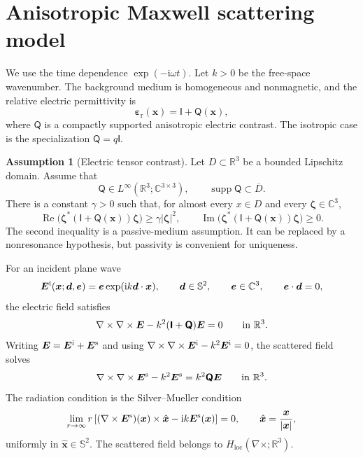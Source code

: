 \documentclass[11pt]{article}
\numberwithin{equation}{section}
\newcommand{\R}{\mathbb{R}}
\newcommand{\C}{\mathbb{C}}
\newcommand{\Sph}{\mathbb{S}}
\newcommand{\ii}{\mathrm{i}}
\newcommand{\supp}{\operatorname{supp}}
\newcommand{\curl}{\nabla\times}
\newcommand{\vect}[1]{\bm{#1}}
\newcommand{\tens}[1]{\bm{\mathsf{#1}}}
\newcommand{\Id}{\ensuremath{\tens{I}}}
\newcommand{\epsr}{\ensuremath{\bm{\varepsilon}_{\mathrm r}}}
\newcommand{\Qt}{\ensuremath{\tens{Q}}}
\newcommand{\abs}[1]{\left\lvert #1\right\rvert}
\theoremstyle{plain}
\theoremstyle{definition}
\newtheorem{assumption}[theorem]{Assumption}
\begin{document}
\section{Anisotropic Maxwell scattering model}\label{sec:forward}

We use the time dependence $\exp(-\ii\omega t)$.  Let $k>0$ be the free-space wavenumber.  The background medium is homogeneous and nonmagnetic, and the relative electric permittivity is
\begin{equation*}
  \epsr(\vect{x})=\Id+\Qt(\vect{x}),
\end{equation*}
where $\Qt$ is a compactly supported anisotropic electric contrast.  The isotropic case is the specialization $\Qt=q\Id$.

\begin{assumption}[Electric tensor contrast]\label{ass:tensor}
Let $D\subset\R^3$ be a bounded Lipschitz domain.  Assume that
\begin{equation*}
  \Qt\in L^\infty(\R^3;\C^{3\times3}),\qquad \supp \Qt\subset \overline D .
\end{equation*}
There is a constant $\gamma>0$ such that, for almost every $x\in D$ and every $\vect{\zeta}\in\C^3$,
\begin{equation*}
  \operatorname{Re}\big(\vect{\zeta}^{*}(\Id+\Qt(\vect{x}))\vect{\zeta}\big)\ge \gamma \abs{\vect{\zeta}}^2,
  \qquad
  \operatorname{Im}\big(\vect{\zeta}^{*}(\Id+\Qt(\vect{x}))\vect{\zeta}\big)\ge 0.
\end{equation*}
The second inequality is a passive-medium assumption.  It can be replaced by a nonresonance hypothesis, but passivity is convenient for uniqueness.
\end{assumption}

For an incident plane wave
\begin{equation*}
  \vect{E}^{\rm i}(\vect{x};\vect{d},\vect{e})=\vect{e}\exp(\ii k \vect{d}\cdot \vect{x}),
  \qquad \vect{d}\in\Sph^2,
  \qquad \vect{e}\in\C^3,
  \qquad \vect{e}\cdot\vect{d}=0,
\end{equation*}
the electric field satisfies
\begin{equation}\label{eq:maxwell_total}
  \curl\curl \vect{E}-k^2(\Id+\Qt)\vect{E}=0 \qquad \hbox{in }\R^3.
\end{equation}
Writing $\vect{E}=\vect{E}^{\rm i}+\vect{E}^{\rm s}$ and using $\curl\curl \vect{E}^{\rm i}-k^2\vect{E}^{\rm i}=0$, the scattered field solves
\begin{equation*}
  \curl\curl \vect{E}^{\rm s}-k^2\vect{E}^{\rm s}=k^2\Qt\vect{E} \qquad \hbox{in }\R^3.
\end{equation*}
The radiation condition is the Silver--Mueller condition
\begin{equation*}
  \lim_{r\to\infty} r\left[(\curl \vect{E}^{\rm s})(\vect{x})\times \hat{\vect{x}}-\ii k \vect{E}^{\rm s}(\vect{x})\right]=0,
  \qquad \hat{\vect{x}}=\frac{\vect{x}}{\abs{\vect{x}}},
\end{equation*}
uniformly in $\hat{\vect{x}}\in\Sph^2$.  The scattered field belongs to $H_{\mathrm{loc}}(\curl;\R^3)$.
\end{document}
